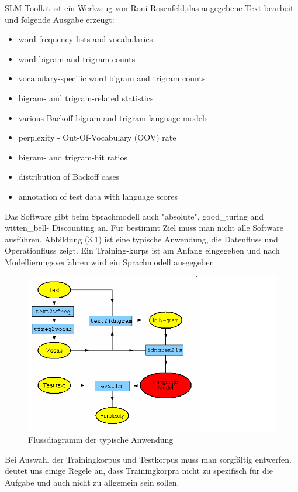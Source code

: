 SLM-Toolkit ist ein Werkzeug von Roni Rosenfeld,das angegebene Text bearbeit und folgende Ausgabe erzeugt:
\begin{itemize}
	\item word frequency lists and vocabularies
	\item word bigram and trigram counts
	\item vocabulary-specific word bigram and trigram counts
	\item bigram- and trigram-related statistics
	\item various Backoff bigram and trigram language models
	\item perplexity - Out-Of-Vocabulary (OOV) rate 
	\item bigram- and trigram-hit ratios
	\item distribution of Backoff cases 
	\item annotation of test data with language scores 
\end{itemize}

Das Software gibt beim Sprachmodell auch "absolute", good\_turing and witten\_bell- Discounting an.
F\"ur bestimmt Ziel muss man nicht alle Software ausf\"uhren. Abbildung (3.1) ist eine typische Anwendung, die Datenfluss und Operationfluss zeigt.
Ein Training-kurps ist am Anfang eingegeben und nach Modellierungsverfahren wird ein Sprachmodell ausgegeben


\begin{figure}[htbp]
	\includegraphics[scale=0.3]{bilder/toolkit.png}
	 \caption{Flussdiagramm der typische Anwendung}
  \label{fig:figure_2}
\end{figure}

Bei Auswahl der Trainingkorpus und Testkorpus muss man sorgf\"altig entwerfen. \cite{book_speech} deutet uns einige Regele an, dass Trainingkorpra nicht zu spezifisch f\"ur die Aufgabe und auch nicht zu allgemein sein sollen.  

